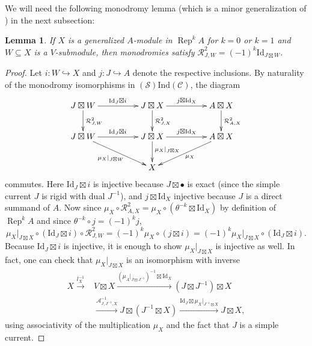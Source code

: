 \documentclass[11pt, reqno]{amsart}
\newtheorem{lem}[thm]{Lemma}
\theoremstyle{definition}\newtheorem{defi}[thm]{Definition}
\theoremstyle{definition}\newtheorem{rem}[thm]{Remark}
\theoremstyle{definition}\newtheorem{exam}[thm]{Example}
\theoremstyle{definition}\newtheorem{assum}[thm]{Assumption}
\newcommand{\cA}{\mathcal{A}}
\newcommand{\cR}{\mathcal{R}}
\newcommand{\cS}{\mathcal{S}}
\newcommand{\cC}{\mathcal{C}}
\newcommand{\Id}{\mathrm{Id}}
\newcommand{\tens}{\boxtimes}
\newcommand{\ind}{\mathrm{Ind}}
\DeclareMathOperator{\rep}{Rep}
\begin{document}
We will need the following monodromy lemma (which is a minor generalization of \cite[Proposition 6.4]{CMY-singlet-typical}) in the next subsection:
\begin{lem}\label{lem:monodromy}
 If $X$ is a generalized $A$-module in $\rep^kA$ for $k=0$ or $k=1$ and $W\subseteq X$ is a $V$-submodule, then monodromies satisfy $\cR^2_{J,W}=(-1)^k\Id_{J\tens W}$.
\end{lem}
\begin{proof}
 Let $i: W\hookrightarrow X$ and $j: J\hookrightarrow A$ denote the respective inclusions. By naturality of the monodromy isomorphisms in $(\cS)\ind(\cC)$, the diagram
 \begin{equation*}
 \xymatrixcolsep{4pc}
  \xymatrix{
  J\tens W \ar[d]^{\cR_{J,W}^2} \ar[r]^{\Id_J\tens i} & J\tens X \ar[d]^{\cR_{J,X}^2} \ar[r]^{j\tens\Id_X} & A\tens X \ar[d]^{\cR^2_{A,X}}\\
  J\tens W \ar[r]^{\Id_J\tens i} \ar[rd]_{\mu_X\vert_{J\tens W}} & J\tens X \ar[d]^(.4){\mu_X\vert_{J\tens X}} \ar[r]^{j\tens\Id_X} & A\tens X \ar[ld]^{\mu_X}\\
  & X & \\
  }
 \end{equation*}
commutes. Here $\Id_J\tens i$ is injective because $J\tens\bullet$ is exact (since the simple current $J$ is rigid with dual $J^{-1}$), and $j\tens\Id_X$ injective because $J$ is a direct summand of $A$. Now since $\mu_X\circ\cR_{A,X}^2=\mu_X\circ(\theta^{-k}\tens\Id_X)$ by definition of $\rep^kA$ and since $\theta^{-k}\circ j=(-1)^k j$,
\begin{equation*}
 \mu_X\vert_{J\tens X}\circ(\Id_J\tens i)\circ\cR_{J,W}^2=(-1)^k\mu_X\circ(j\tens i)=(-1)^k\mu_X\vert_{J\tens X}\circ(\Id_J\tens i).
\end{equation*}
Because $\Id_J\tens i$ is injective, it is enough to show $\mu_X\vert_{J\tens X}$ is injective as well. In fact, one can check that $\mu_X\vert_{J\tens X}$ is an isomorphism with inverse
\begin{align*}
 X\xrightarrow{l_X^{-1}} & V\tens X\xrightarrow{(\mu_A\vert_{J\tens J^{-1}})^{-1}\tens\Id_X} (J\tens J^{-1})\tens X\nonumber\\
 &\xrightarrow{\cA_{J,J^{-1},X}^{-1}} J\tens(J^{-1}\tens X)\xrightarrow{\Id_J\tens\mu_X\vert_{J^{-1}\tens X}} J\tens X,
\end{align*}
using associativity of the multiplication $\mu_X$ and the fact that $J$ is a simple current.
\end{proof} 
\end{document}
